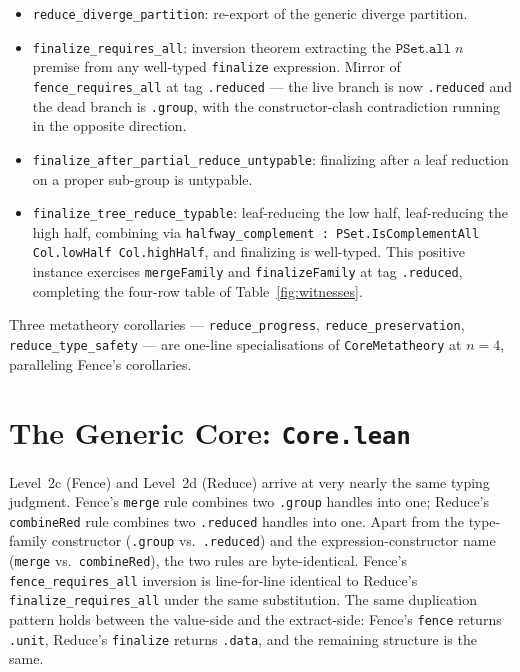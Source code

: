 \documentclass[acmsmall,screen,review,anonymous,nonacm]{acmart}
\begin{document}
\begin{itemize}
  \item \texttt{reduce\_diverge\_partition}: re-export of the generic diverge partition.
  \item \texttt{finalize\_requires\_all}: inversion theorem extracting the $\texttt{PSet.all}\;n$ premise from any well-typed \texttt{finalize} expression. Mirror of \texttt{fence\_requires\_all} at tag \texttt{.reduced} --- the live branch is now \texttt{.reduced} and the dead branch is \texttt{.group}, with the constructor-clash contradiction running in the opposite direction.
  \item \texttt{finalize\_after\_partial\_reduce\_untypable}: finalizing after a leaf reduction on a proper sub-group is untypable.
  \item \texttt{finalize\_tree\_reduce\_typable}: leaf-reducing the low half, leaf-reducing the high half, combining via \texttt{halfway\_complement : PSet.IsComplementAll Col.lowHalf Col.highHalf}, and finalizing is well-typed. This positive instance exercises \texttt{mergeFamily} and \texttt{finalizeFamily} at tag \texttt{.reduced}, completing the four-row table of Table~\ref{fig:witnesses}.
\end{itemize}

Three metatheory corollaries --- \texttt{reduce\_progress}, \texttt{reduce\_preservation}, \texttt{reduce\_type\_safety} --- are one-line specialisations of \texttt{CoreMetatheory} at $n = 4$, paralleling Fence's corollaries.


\section{The Generic Core: \texttt{Core.lean}}\label{sec:core}

Level~2c (Fence) and Level~2d (Reduce) arrive at very nearly the same typing judgment. Fence's \texttt{merge} rule combines two \texttt{.group} handles into one; Reduce's \texttt{combineRed} rule combines two \texttt{.reduced} handles into one. Apart from the type-family constructor (\texttt{.group} vs.\ \texttt{.reduced}) and the expression-constructor name (\texttt{merge} vs.\ \texttt{combineRed}), the two rules are byte-identical. Fence's \texttt{fence\_requires\_all} inversion is line-for-line identical to Reduce's \texttt{finalize\_requires\_all} under the same substitution. The same duplication pattern holds between the value-side and the extract-side: Fence's \texttt{fence} returns \texttt{.unit}, Reduce's \texttt{finalize} returns \texttt{.data}, and the remaining structure is the same.
\end{document}
